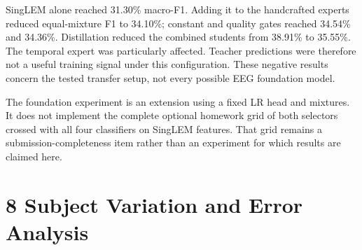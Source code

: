 \documentclass[10pt,a4paper]{article}
\begin{document}
SingLEM alone reached 31.30\% macro-F1. Adding it to the handcrafted experts reduced equal-mixture F1 to 34.10\%; constant and quality gates reached 34.54\% and 34.36\%. Distillation reduced the combined students from 38.91\% to 35.55\%. The temporal expert was particularly affected. Teacher predictions were therefore not a useful training signal under this configuration. These negative results concern the tested transfer setup, not every possible EEG foundation model.


The foundation experiment is an extension using a fixed LR head and mixtures. It does not implement the complete optional homework grid of both selectors crossed with all four classifiers on SingLEM features. That grid remains a submission-completeness item rather than an experiment for which results are claimed here.


\section*{8 Subject Variation and Error Analysis}
\end{document}
